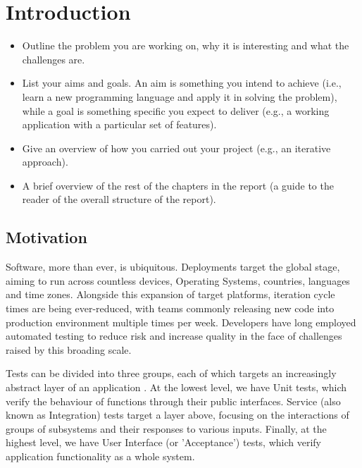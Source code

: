 \section{Introduction}
\label{sec:intro}

\begin{mdframed}
	\begin{itemize}
		\item Outline the problem you are working on, why it is interesting and what the challenges are.
		\item List your aims and goals. An aim is something you intend to achieve (i.e., learn a new programming language and apply it in solving the problem), while a goal is something specific you expect to deliver (e.g., a working application with a particular set of features).
		\item Give an overview of how you carried out your project (e.g., an iterative approach).
		\item A brief overview of the rest of the chapters in the report (a guide to the reader of the overall structure of the report).
	\end{itemize}
\end{mdframed}

\subsection{Motivation}

Software, more than ever, is ubiquitous. Deployments target the global stage, aiming to run across countless devices, Operating Systems, countries, languages and time zones. Alongside this expansion of target platforms, iteration cycle times are being ever-reduced, with teams commonly releasing new code into production environment multiple times per week. Developers have long employed automated testing to reduce risk and increase quality in the face of challenges raised by this broading scale.

Tests can be divided into three groups, each of which targets an increasingly abstract layer of an application \cite[Chapter~16]{cohn2009succeeding}. At the lowest level, we have Unit tests, which verify the behaviour of functions through their public interfaces. Service (also known as Integration) tests target a layer above, focusing on the interactions of groups of subsystems and their responses to various inputs. Finally, at the highest level, we have User Interface (or 'Acceptance') tests, which verify application functionality as a whole system.

